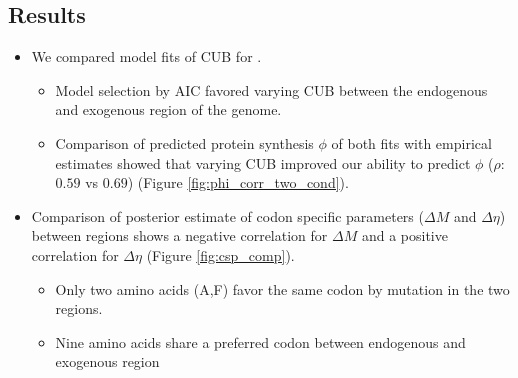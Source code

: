 \documentclass[12pt]{article}
\begin{document}
\subsection*{Results}

\begin{itemize}
	\item We compared model fits of CUB for \kluyveri. %
	\begin{itemize}
		\item Model selection by AIC favored varying CUB between the endogenous and exogenous region of the \kluyveri genome.
		\item Comparison of predicted protein synthesis $\phi$ of both fits with empirical estimates showed that varying CUB improved our ability to predict $\phi$ ($\rho$: $0.59$ vs $0.69$) (Figure \ref{fig:phi_corr_two_cond}).
	\end{itemize}
	\item Comparison of posterior estimate of codon specific parameters ($\Delta M$ and $\Delta \eta$) between regions shows a negative correlation for $\Delta M$ and a positive correlation for $\Delta \eta$ (Figure  \ref{fig:csp_comp}).
	\begin{itemize}
		\item Only two amino acids (A,F) favor the same codon by mutation in the two regions.
		\item Nine amino acids share a preferred codon between endogenous and exogenous region%

\end{itemize}
\end{itemize}
\end{document}
